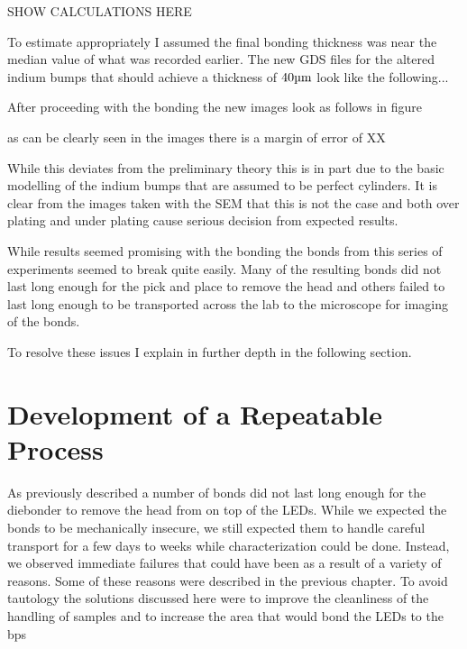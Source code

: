 SHOW CALCULATIONS HERE

To estimate appropriately I assumed the final bonding thickness was near the median value of what was recorded earlier. The new GDS files for the altered indium bumps that should achieve a thickness of $40 \um$ look like the following...

After proceeding with the bonding the new images look as follows in figure


as can be clearly seen in the images there is a margin of error of XX%

While this deviates from the preliminary theory this is in part due to the basic modelling of the indium bumps that are assumed to be perfect cylinders. It is clear from the images taken with the SEM that this is not the case and both over plating and under plating cause serious decision from expected results.

While results seemed promising with the bonding the bonds from this series of experiments seemed to break quite easily. Many of the resulting bonds did not last long enough for the pick and place to remove the head and others failed to last long enough to be transported across the lab to the microscope for imaging of the bonds.

To resolve these issues I explain in further depth in the following section.


\section{Development of a Repeatable Process}
\label{sec:Ch2_repeatable}

As previously described a number of bonds did not last long enough for the diebonder to remove the head from on top of the LEDs. While we expected the bonds to be mechanically insecure, we still expected them to handle careful transport for a few days to weeks while characterization could be done. Instead, we observed immediate failures that could have been as a result of a variety of reasons. Some of these reasons were described in the previous chapter. To avoid tautology the solutions discussed here were to improve the cleanliness of the handling of samples and to increase the area that would bond the LEDs to the bps



